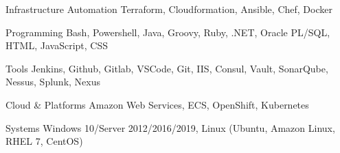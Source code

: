 

\begin{cvskills}

  \cvskill
    {Infrastructure Automation} %
    {Terraform, Cloudformation, Ansible, Chef, Docker} %

  \cvskill
    {Programming} %
    {Bash, Powershell, Java, Groovy, Ruby, .NET, Oracle PL/SQL, HTML, JavaScript, CSS} %

  \cvskill
    {Tools} %
    {Jenkins, Github, Gitlab, VSCode, Git, IIS, Consul, Vault, SonarQube, Nessus, Splunk, Nexus} %

  \cvskill
    {Cloud \& Platforms} %
    {Amazon Web Services, ECS, OpenShift, Kubernetes} %

  \cvskill
    {Systems} %
    {Windows 10/Server 2012/2016/2019, Linux (Ubuntu, Amazon Linux, RHEL 7, CentOS)} %

\end{cvskills}
